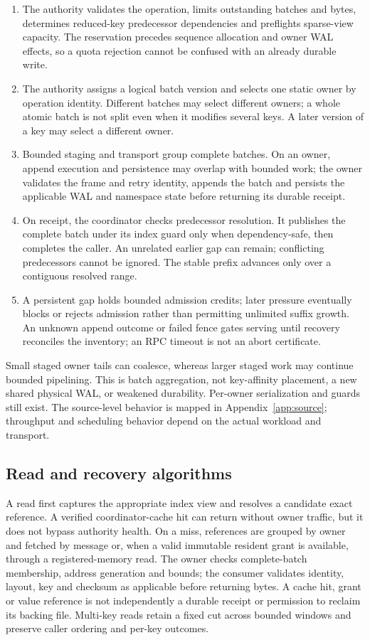 \documentclass[11pt,a4paper]{article}
\begin{document}
\begin{enumerate}
\item The authority validates the operation, limits outstanding batches and bytes, determines reduced-key predecessor dependencies and preflights sparse-view capacity. The reservation precedes sequence allocation and owner WAL effects, so a quota rejection cannot be confused with an already durable write.
\item The authority assigns a logical batch version and selects one static owner by operation identity. Different batches may select different owners; a whole atomic batch is not split even when it modifies several keys. A later version of a key may select a different owner.
\item Bounded staging and transport group complete batches. On an owner, append execution and persistence may overlap with bounded work; the owner validates the frame and retry identity, appends the batch and persists the applicable WAL and namespace state before returning its durable receipt.
\item On receipt, the coordinator checks predecessor resolution. It publishes the complete batch under its index guard only when dependency-safe, then completes the caller. An unrelated earlier gap can remain; conflicting predecessors cannot be ignored. The stable prefix advances only over a contiguous resolved range.
\item A persistent gap holds bounded admission credits; later pressure eventually blocks or rejects admission rather than permitting unlimited suffix growth. An unknown append outcome or failed fence gates serving until recovery reconciles the inventory; an RPC timeout is not an abort certificate.
\end{enumerate}
Small staged owner tails can coalesce, whereas larger staged work may continue bounded pipelining. This is batch aggregation, not key-affinity placement, a new shared physical WAL, or weakened durability. Per-owner serialization and guards still exist. The source-level behavior is mapped in Appendix~\ref{app:source}; throughput and scheduling behavior depend on the actual workload and transport.

\subsection{Read and recovery algorithms}\label{sec:algorithm-detail}
A read first captures the appropriate index view and resolves a candidate exact reference. A verified coordinator-cache hit can return without owner traffic, but it does not bypass authority health. On a miss, references are grouped by owner and fetched by message or, when a valid immutable resident grant is available, through a registered-memory read. The owner checks complete-batch membership, address generation and bounds; the consumer validates identity, layout, key and checksum as applicable before returning bytes. A cache hit, grant or value reference is not independently a durable receipt or permission to reclaim its backing file. Multi-key reads retain a fixed cut across bounded windows and preserve caller ordering and per-key outcomes.
\end{document}
